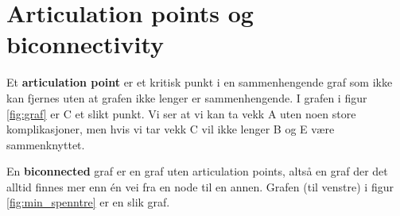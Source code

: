\section{Articulation points og biconnectivity}
Et \textbf{articulation point} er et kritisk punkt i en sammenhengende graf som ikke kan fjernes uten at grafen ikke lenger er sammenhengende. I grafen i figur \ref{fig:graf} er C et slikt punkt. Vi ser at vi kan ta vekk A uten noen store komplikasjoner, men hvis vi tar vekk C vil ikke lenger B og E være sammenknyttet.

En \textbf{biconnected} graf er en graf uten articulation points, altså en graf der det alltid finnes mer enn én vei fra en node til en annen. Grafen (til venstre) i figur \ref{fig:min_spenntre} er en slik graf. 